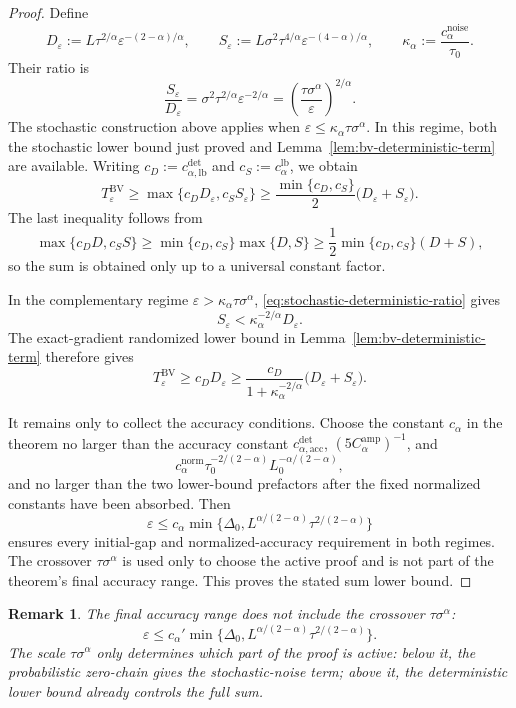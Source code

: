 \documentclass[11pt]{article}
\newtheorem{remark}[theorem]{Remark}
\begin{document}
\begin{proof}
Define
\[
D_\varepsilon:=L\tau^{2/\alpha}\varepsilon^{-(2-\alpha)/\alpha},
\qquad
S_\varepsilon:=L\sigma^2\tau^{4/\alpha}\varepsilon^{-(4-\alpha)/\alpha},
\qquad
\kappa_\alpha:=\frac{c_\alpha^{\mathrm{noise}}}{\tau_0}.
\]
Their ratio is
\begin{equation}
\label{eq:stochastic-deterministic-ratio}
\frac{S_\varepsilon}{D_\varepsilon}
=
\sigma^2\tau^{2/\alpha}\varepsilon^{-2/\alpha}
=
\left(\frac{\tau\sigma^\alpha}{\varepsilon}\right)^{2/\alpha}.
\end{equation}
The stochastic construction above applies when
$\varepsilon\le\kappa_\alpha\tau\sigma^\alpha$. In this regime, both the stochastic lower bound just proved and
Lemma~\ref{lem:bv-deterministic-term} are available. Writing
$c_D:=c_{\alpha,\mathrm{lb}}^{\mathrm{det}}$ and $c_S:=c_\alpha^{\mathrm{lb}}$, we obtain
\[
T_\varepsilon^{\mathrm{BV}}
\ge
\max\{c_DD_\varepsilon,c_SS_\varepsilon\}
\ge
\frac{\min\{c_D,c_S\}}{2}
\bigl(D_\varepsilon+S_\varepsilon\bigr).
\]
The last inequality follows from
\[
\max\{c_DD,c_SS\}
\ge
\min\{c_D,c_S\}\max\{D,S\}
\ge
\frac12\min\{c_D,c_S\}(D+S),
\]
so the sum is obtained only up to a universal constant factor.

In the complementary regime $\varepsilon>\kappa_\alpha\tau\sigma^\alpha$,
\eqref{eq:stochastic-deterministic-ratio} gives
\[
S_\varepsilon<\kappa_\alpha^{-2/\alpha}D_\varepsilon.
\]
The exact-gradient randomized lower bound in Lemma~\ref{lem:bv-deterministic-term} therefore gives
\[
T_\varepsilon^{\mathrm{BV}}
\ge
c_DD_\varepsilon
\ge
\frac{c_D}{1+\kappa_\alpha^{-2/\alpha}}
\bigl(D_\varepsilon+S_\varepsilon\bigr).
\]

It remains only to collect the accuracy conditions. Choose the constant $c_\alpha$ in the theorem no larger than
the accuracy constant $c_{\alpha,\mathrm{acc}}^{\mathrm{det}}$, $(5C_\alpha^{\mathrm{amp}})^{-1}$, and
\[
c_\alpha^{\mathrm{norm}}
\tau_0^{-2/(2-\alpha)}L_0^{-\alpha/(2-\alpha)},
\]
and no larger than the two lower-bound prefactors after the fixed normalized constants have been absorbed. Then
\[
\varepsilon\le
c_\alpha\min\{\Delta_0,L^{\alpha/(2-\alpha)}\tau^{2/(2-\alpha)}\}
\]
ensures every initial-gap and normalized-accuracy requirement in both regimes. The crossover
$\tau\sigma^\alpha$ is used only to choose the active proof and is not part of the theorem's final accuracy range.
This proves the stated sum lower bound.
\end{proof}

\begin{remark}
The final accuracy range does not include the crossover \(\tau\sigma^\alpha\):
\[
\varepsilon\le c_\alpha' \min\{\Delta_0,L^{\alpha/(2-\alpha)}\tau^{2/(2-\alpha)}\}.
\]
The scale \(\tau\sigma^\alpha\) only determines which part of the proof is active: below it, the probabilistic
zero-chain gives the stochastic-noise term; above it, the deterministic lower bound already controls the full sum.
\end{remark}
\end{document}
